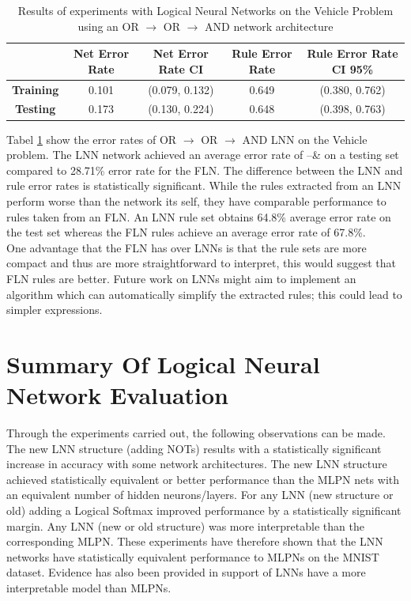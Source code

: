 \begin{table}[H]
	\begin{center}
		\begin{tabular}{| c | c | c | c | c |}
			\hline
			\textbf{} & \textbf{Net Error Rate} & \textbf{Net Error Rate CI} & \textbf{Rule Error Rate} & \textbf{Rule Error Rate CI 95\%}\\
			\hline
			\hline
			\textbf{Training} & 0.101 & (0.079, 0.132) & 0.649 & (0.380, 0.762)\\
			\textbf{Testing} & 0.173 & (0.130, 0.224) & 0.648 & (0.398, 0.763)\\
			\hline
		\end{tabular}
	\end{center}
	\caption{Results of experiments with Logical Neural Networks on the Vehicle Problem using an OR $\rightarrow$ OR $\rightarrow$ AND network architecture}
	\label{tab:vehicle-lnn-peformance}
\end{table}

Tabel \ref{tab:vehicle-lnn-peformance} show the error rates of OR $\rightarrow$ OR $\rightarrow$ AND LNN on the Vehicle problem. The LNN network achieved an average error rate of --\& on a testing set compared to 28.71\% error rate for the FLN. The difference between the LNN and rule error rates is statistically significant. While the rules extracted from an LNN perform worse than the network its self, they have comparable performance to rules taken from an FLN. An LNN rule set obtains 64.8\% average error rate on the test set whereas the FLN rules achieve an average error rate of 67.8\%.\\

One advantage that the FLN has over LNNs is that the rule sets are more compact and thus are more straightforward to interpret, this would suggest that FLN rules are better. Future work on LNNs might aim to implement an algorithm which can automatically simplify the extracted rules; this could lead to simpler expressions.

\section{Summary Of Logical Neural Network Evaluation}
Through the experiments carried out, the following observations can be made. The new LNN structure (adding NOTs) results with a statistically significant increase in accuracy with some network architectures. The new LNN structure achieved statistically equivalent or better performance than the MLPN nets with an equivalent number of hidden neurons/layers. For any LNN (new structure or old) adding a Logical Softmax improved performance by a statistically significant margin. Any LNN (new or old structure) was more interpretable than the corresponding MLPN. These experiments have therefore shown that the LNN networks have statistically equivalent performance to MLPNs on the MNIST dataset. Evidence has also been provided in support of LNNs have a more interpretable model than MLPNs.

